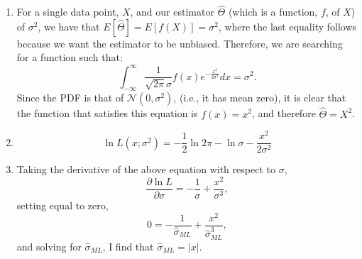 \begin{problem}{7}  $ $

\begin{enumerate}
\item
For a single data point, $X$, and our estimator $\hat \Theta$ (which is a function, $f$, of $X$) of $\sigma^2$, we have that $E[\hat \Theta] = E[f(X)] = \sigma^2$, where the last equality follows because we want the estimator to be unbiased.  Therefore, we are searching for a function such that:
\begin{equation*}
\int_{-\infty}^\infty \frac{1}{\sqrt{2 \pi} \sigma}f(x)e^{-\frac{x^2}{2\sigma^2}}dx = \sigma^2.
\end{equation*}
Since the PDF is that of $\mathcal N(0, \sigma^2)$, (i.e., it has mean zero), it is clear that the function that satisfies this equation is $f(x)=x^2$, and therefore $\hat \Theta = X^2$.

\item
\begin{equation*}
\ln L(x; \sigma^2) = -\frac{1}{2} \ln 2\pi -\ln \sigma -\frac{x^2}{2\sigma^2}
\end{equation*}

\item Taking the derivative of the above equation with respect to $\sigma$, 
\begin{equation*}
\frac{\partial \ln L}{\partial \sigma} = -\frac{1}{\sigma} +\frac{x^2}{\sigma^3},
\end{equation*}
setting equal to zero, 
\begin{equation*}
0 = -\frac{1}{\hat \sigma_{ML}} +\frac{x^2}{\hat \sigma_{ML}^3},
\end{equation*}
and solving for $\hat \sigma_{ML}$, I find that $\hat \sigma_{ML} = |x|$. 

\end{enumerate}


\end{problem}



